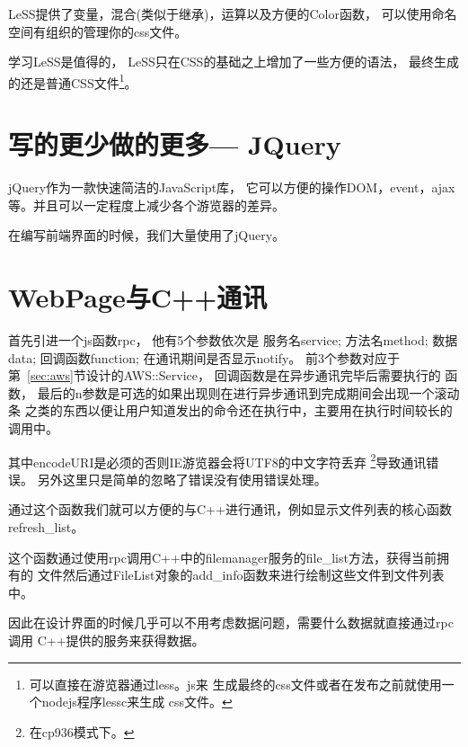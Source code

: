 LeSS\cite{less}提供了变量，混合(类似于继承)，运算以及方便的Color函数，
可以使用命名空间有组织的管理你的css文件。

学习LeSS是值得的， LeSS只在CSS的基础之上增加了一些方便的语法， 
最终生成的还是普通CSS文件\footnote{可以直接在游览器通过less。js来
生成最终的css文件或者在发布之前就使用一个nodejs程序lessc来生成
css文件。}。
\section{写的更少做的更多--- JQuery}
jQuery\cite{jquery}作为一款快速简洁的JavaScript库，
它可以方便的操作DOM，event，ajax等。并且可以一定程度上减少各个游览器的差异。

在编写前端界面的时候，我们大量使用了jQuery。

\section{WebPage与C++通讯}
首先引进一个js函数rpc， 他有5个参数依次是
服务名service;
方法名method;
数据data;
回调函数function;
在通讯期间是否显示notify。
前3个参数对应于第~\ref{sec:aws}节设计的AWS::Service， 回调函数是在异步通讯完毕后需要执行的
函数， 最后的n参数是可选的如果出现则在进行异步通讯到完成期间会出现一个滚动条
之类的东西以便让用户知道发出的命令还在执行中，主要用在执行时间较长的调用中。
\newpage
{}
其中encodeURI是必须的否则IE游览器会将UTF8的中文字符丢弃
\footnote{在cp936模式下。}导致通讯错误。 
另外这里只是简单的忽略了错误没有使用错误处理。

通过这个函数我们就可以方便的与C++进行通讯，例如显示文件列表的核心函数
refresh\_list。
这个函数通过使用rpc调用C++中的filemanager服务的file\_list方法，获得当前拥有的
文件然后通过FileList对象的add\_info函数来进行绘制这些文件到文件列表中。

因此在设计界面的时候几乎可以不用考虑数据问题，需要什么数据就直接通过rpc调用
C++提供的服务来获得数据。

